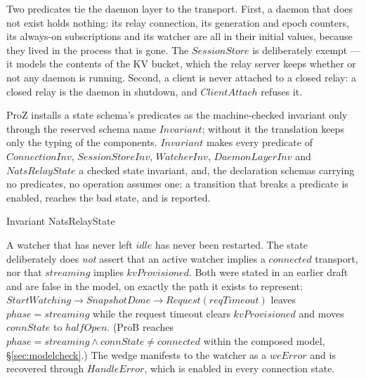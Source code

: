 \documentclass[a4paper,10pt,fleqn]{article}
\begin{document}
Two predicates tie the daemon layer to the transport.  First, a daemon
that does not exist holds nothing: its relay connection, its generation
and epoch counters, its always-on subscriptions and its watcher are all
in their initial values, because they lived in the process that is gone.
The $SessionStore$ is deliberately exempt --- it models the contents of
the KV bucket, which the relay server keeps whether or not any daemon is
running.  Second, a client is never attached to a closed relay: a closed
relay is the daemon in shutdown, and $ClientAttach$ refuses it.

ProZ installs a state schema's predicates as the machine-checked invariant
only through the reserved schema name $Invariant$; without it the
translation keeps only the typing of the components.  $Invariant$ makes
every predicate of $ConnectionInv$, $SessionStoreInv$, $WatcherInv$,
$DaemonLayerInv$ and $NatsRelayState$ a checked state invariant, and, the
declaration schemas carrying no predicates, no operation assumes one: a
transition that breaks a predicate is enabled, reaches the bad state, and
is reported.

\begin{schema}{Invariant}
  NatsRelayState
\end{schema}

A watcher that has never left $idle$ has never been restarted.  The
state deliberately does \emph{not} assert that an active watcher implies
a $connected$ transport, nor that $streaming$ implies $kvProvisioned$.
Both were stated in an earlier draft and are false in the model, on
exactly the path it exists to represent: $StartWatching \to SnapshotDone
\to Request(reqTimeout)$ leaves $phase = streaming$ while the request
timeout clears $kvProvisioned$ and moves $connState$ to $halfOpen$.
(ProB reaches $phase = streaming \land connState \neq connected$
within the composed model, \S\ref{sec:modelcheck}.)  The wedge manifests
to the watcher as a $weError$ and is recovered through $HandleError$,
which is enabled in every connection state.
\end{document}
